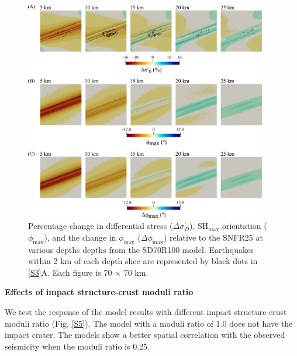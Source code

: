 \documentclass[draft,jgrga]{agutexSI2019}
\begin{document}
\begin{article}
\begin{figure}[ht]
\includegraphics[width=25pc]{Figures/SD70R100_S1.png}
\caption{Percentage change in differential stress ($\Delta\sigma_{D}^{\prime}$), SH$_{\max}$ orientation ($\phi_{\max}$), and the change in $\phi_{\max}$ ($\Delta\phi_{\max}$) relative to the SNFR25 at various depths depths from the SD70R100 model. Earthquakes within 2 km of each depth slice are represented by black dots in \ref{S3}A. Each figure is 70 $\times$ 70 km.}
\label{S4}
\end{figure}

\vspace{10mm} %


\noindent\textbf{Effects of impact structure-crust moduli ratio}

We test the response of the model results with different impact structure-crust moduli ratio (Fig. \ref{S5}). The model with a moduli ratio of 1.0 does not have the impact crater. The models show a better spatial correlation with the observed seismicity when the moduli ratio is 0.25. 

\vspace{10mm} %


\end{article}
\end{document}
